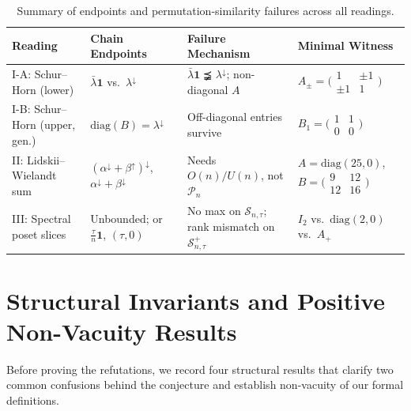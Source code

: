 \documentclass[11pt]{article}
\theoremstyle{definition}
\theoremstyle{remark}
\newcommand{\Pn}{\mathcal{P}_n}
\newcommand{\On}{O(n)}
\newcommand{\Un}{U(n)}
\newcommand{\diag}{\mathrm{diag}}
\newcommand{\Ones}{\mathbf{1}}
\begin{document}
\begin{table}[ht]
\centering
\caption{Summary of endpoints and permutation-similarity failures across all readings.}
\label{tab:summary}
\vspace{4pt}
{\small
\begin{tabular}{p{1.38in}p{1.28in}p{1.50in}p{1.48in}}
\hline
\textbf{Reading} & \textbf{Chain Endpoints} & \textbf{Failure Mechanism} & \textbf{Minimal Witness} \tabularnewline
\hline
\raggedright I-A: Schur--Horn (lower) &
  \raggedright $\bar{\lambda}\Ones$ vs.\ $\lambda^\downarrow$ &
  \raggedright $\bar{\lambda}\Ones \precneqq \lambda^\downarrow$; non-diagonal $A$ &
  \raggedright $A_\pm = \bigl(\begin{smallmatrix}1 & \pm 1\\ \pm 1 & 1\end{smallmatrix}\bigr)$ \tabularnewline
\raggedright I-B: Schur--Horn (upper, gen.) &
  \raggedright $\diag(B) = \lambda^\downarrow$ &
  \raggedright Off-diagonal entries survive &
  \raggedright $B_1 = \bigl(\begin{smallmatrix}1 & 1\\ 0 & 0\end{smallmatrix}\bigr)$ \tabularnewline
\raggedright II: Lidskii--Wielandt sum &
  \raggedright $(\alpha^\downarrow+\beta^\uparrow)^\downarrow$, $\alpha^\downarrow+\beta^\downarrow$ &
  \raggedright Needs $\On/\Un$, not $\Pn$ &
  \raggedright $A=\diag(25,0)$, $B=\bigl(\begin{smallmatrix}9&12\\12&16\end{smallmatrix}\bigr)$ \tabularnewline
\raggedright III: Spectral poset slices &
  \raggedright Unbounded; or $\frac{\tau}{n}\Ones$, $(\tau,0)$ &
  \raggedright No max on $\mathcal{S}_{n,\tau}$; rank mismatch on $\mathcal{S}_{n,\tau}^+$ &
  \raggedright $I_2$ vs.\ $\diag(2,0)$ vs.\ $A_+$ \tabularnewline
\hline
\end{tabular}
}
\end{table}

\section{Structural Invariants and Positive Non-Vacuity Results}
\label{sec:nonvacuity}

Before proving the refutations, we record four structural results that clarify
two common confusions behind the conjecture and establish non-vacuity of our
formal definitions.
\end{document}
